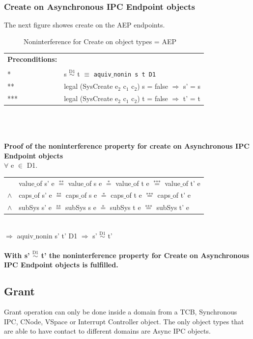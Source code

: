 \documentclass[pdftex,11pt,a4paper,twoside]{article}
\begin{document}
\subsubsection{Create on Asynchronous IPC Endpoint objects}
The next figure showes create on the AEP endpoints.
\begin{flushleft}
\begin{figure}[H]
\caption{Noninterference for Create on object types = AEP}
\end{figure}
\end{flushleft}
\begin{tabular}{ll}
\textbf{Preconditions:} \\ \\
* & s $\overset{\text{D1}}{\sim}$ t $\equiv$ \texttt{aquiv$\_$nonin s t D1}	\\ 
** & legal (SysCreate e$_2$ c$_1$ c$_2$) s = false $\Rightarrow$ s' = s \\ 
*** & legal (SysCreate e$_2$ c$_1$ c$_2$) t = false $\Rightarrow$ t' = t
\end{tabular}\\ \\ \\
\textbf{Proof of the noninterference property for create on Asynchronous IPC Endpoint objects}\\ 
$\forall$ e $\in$ D1. \\ 
\begin{tabular}{ll}
& value$\_$of s' e $\overset{\text{**}}{=}$ value$\_$of s e $\overset{\text{*}}{=}$ value$\_$of t e $\overset{\text{***}}{=}$ value$\_$of t' e \\
$\wedge$ & caps$\_$of s' e $\overset{\text{**}}{=}$ caps$\_$of s e $\overset{\text{*}}{=}$ caps$\_$of t e $\overset{\text{***}}{=}$ caps$\_$of t' e \\
$\wedge$ & subSys s' e $\overset{\text{**}}{=}$ subSys s e $\overset{\text{*}}{=}$ subSys t e $\overset{\text{***}}{=}$ subSys t' e
\end{tabular} \\
$\Rightarrow$ aquiv$\_$nonin s' t' D1 $\Rightarrow$ s' $\overset{\text{D1}}{\sim}$ t' \\ \\
\textbf{With s' $\overset{\text{D1}}{\sim}$ t' the noninterference property for Create on Asynchronous IPC Endpoint objects is fulfilled.} 
\subsection{Grant}\label{sec:Grant}
Grant operation can only be done inside a domain from a TCB, Synchronous IPC, CNode, VSpace or Interrupt Controller object. The only object types that are able to have contact to different domains are Async IPC objects.
\end{document}
